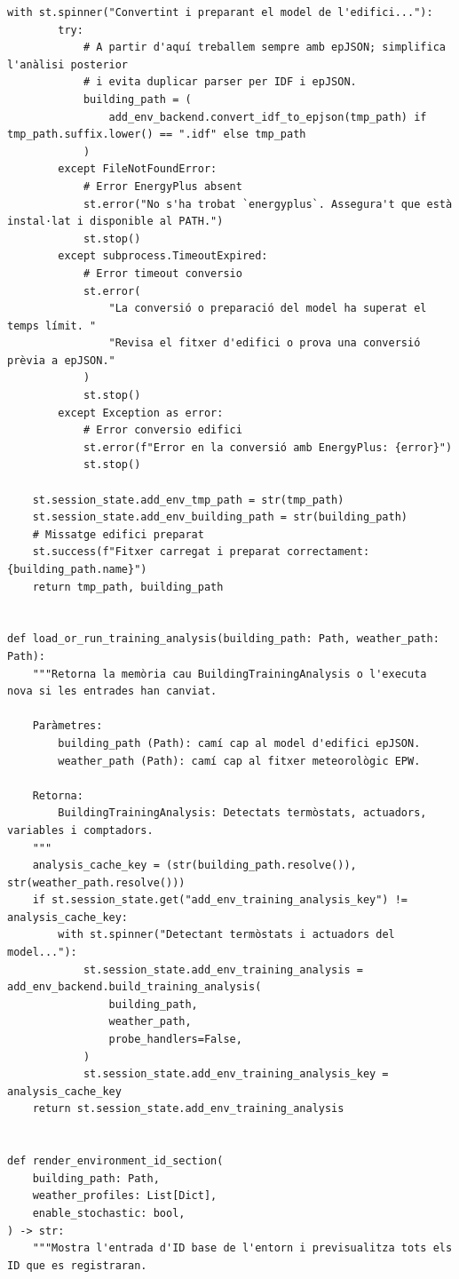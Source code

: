 \documentclass[10pt,a4paper]{article}
\begin{document}
\begin{lstlisting}[style=studioPython,caption={pages/Afegir\_Entorn.py},label={lst:pages-afegir-entorn-py}]
    with st.spinner("Convertint i preparant el model de l'edifici..."):
        try:
            # A partir d'aquí treballem sempre amb epJSON; simplifica l'anàlisi posterior
            # i evita duplicar parser per IDF i epJSON.
            building_path = (
                add_env_backend.convert_idf_to_epjson(tmp_path) if tmp_path.suffix.lower() == ".idf" else tmp_path
            )
        except FileNotFoundError:
            # Error EnergyPlus absent
            st.error("No s'ha trobat `energyplus`. Assegura't que està instal·lat i disponible al PATH.")
            st.stop()
        except subprocess.TimeoutExpired:
            # Error timeout conversio
            st.error(
                "La conversió o preparació del model ha superat el temps límit. "
                "Revisa el fitxer d'edifici o prova una conversió prèvia a epJSON."
            )
            st.stop()
        except Exception as error:
            # Error conversio edifici
            st.error(f"Error en la conversió amb EnergyPlus: {error}")
            st.stop()

    st.session_state.add_env_tmp_path = str(tmp_path)
    st.session_state.add_env_building_path = str(building_path)
    # Missatge edifici preparat
    st.success(f"Fitxer carregat i preparat correctament: {building_path.name}")
    return tmp_path, building_path


def load_or_run_training_analysis(building_path: Path, weather_path: Path):
    """Retorna la memòria cau BuildingTrainingAnalysis o l'executa nova si les entrades han canviat.

    Paràmetres:
        building_path (Path): camí cap al model d'edifici epJSON.
        weather_path (Path): camí cap al fitxer meteorològic EPW.

    Retorna:
        BuildingTrainingAnalysis: Detectats termòstats, actuadors, variables i comptadors.
    """
    analysis_cache_key = (str(building_path.resolve()), str(weather_path.resolve()))
    if st.session_state.get("add_env_training_analysis_key") != analysis_cache_key:
        with st.spinner("Detectant termòstats i actuadors del model..."):
            st.session_state.add_env_training_analysis = add_env_backend.build_training_analysis(
                building_path,
                weather_path,
                probe_handlers=False,
            )
            st.session_state.add_env_training_analysis_key = analysis_cache_key
    return st.session_state.add_env_training_analysis


def render_environment_id_section(
    building_path: Path,
    weather_profiles: List[Dict],
    enable_stochastic: bool,
) -> str:
    """Mostra l'entrada d'ID base de l'entorn i previsualitza tots els ID que es registraran.


\end{lstlisting}
\end{document}
